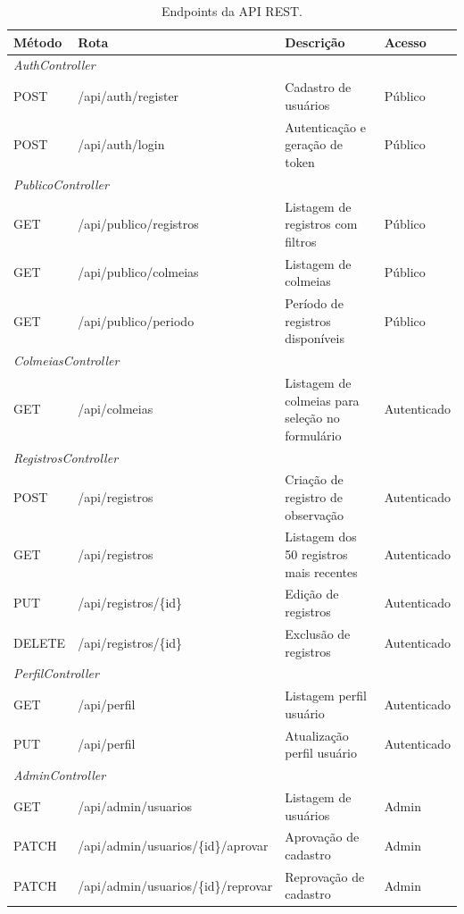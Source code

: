 \documentclass[12pt]{unisenaiclass}
\begin{document}
\begin{longtable}{llp{5cm}l}
\caption{Endpoints da API REST.}
\label{tab:endpoints}\\

\hline
\textbf{Método} & \textbf{Rota} & \textbf{Descrição} & \textbf{Acesso} \\
\hline
\multicolumn{4}{l}{\textit{AuthController}} \\
\hline
POST & /api/auth/register & Cadastro de usuários & Público \\
POST & /api/auth/login    & Autenticação e geração de token & Público \\
\hline
\multicolumn{4}{l}{\textit{PublicoController}} \\
\hline
GET & /api/publico/registros & Listagem de registros com filtros & Público \\
GET & /api/publico/colmeias  & Listagem de colmeias & Público \\
GET & /api/publico/periodo   & Período de registros disponíveis & Público \\
\hline
\multicolumn{4}{l}{\textit{ColmeiasController}} \\
\hline
GET & /api/colmeias & Listagem de colmeias para seleção no formulário & Autenticado \\
\hline
\multicolumn{4}{l}{\textit{RegistrosController}} \\
\hline
POST   & /api/registros      & Criação de registro de observação & Autenticado \\
GET    & /api/registros      & Listagem dos 50 registros mais recentes & Autenticado \\
PUT    & /api/registros/\{id\} & Edição de registros & Autenticado \\
DELETE & /api/registros/\{id\} & Exclusão de registros & Autenticado \\
\hline
\multicolumn{4}{l}{\textit{PerfilController}} \\
\hline
GET & /api/perfil & Listagem perfil usuário & Autenticado \\
PUT & /api/perfil & Atualização perfil usuário & Autenticado \\
\hline
\multicolumn{4}{l}{\textit{AdminController}} \\
\hline
GET   & /api/admin/usuarios                        & Listagem de usuários & Admin \\
PATCH & /api/admin/usuarios/\{id\}/aprovar          & Aprovação de cadastro & Admin \\
PATCH & /api/admin/usuarios/\{id\}/reprovar         & Reprovação de cadastro & Admin \\

\end{longtable}
\end{document}
